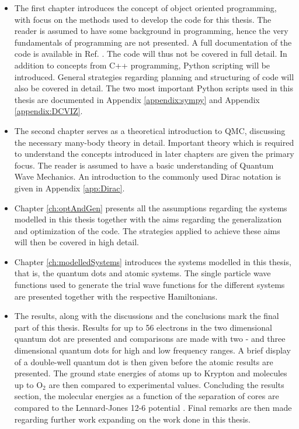 \begin{itemize}
 \item The first chapter introduces the concept of object oriented programming, with focus on the methods used to develop the code for this thesis. The reader is assumed to have some background in programming, hence the very fundamentals of programming are not presented. A full documentation of the code is available in Ref. \cite{libBorealisCode}. The code will thus not be covered in full detail. In addition to concepts from C++ programming, Python scripting will be introduced. General strategies regarding planning and structuring of code will also be covered in detail. The two most important Python scripts used in this thesis are documented in Appendix \ref{appendix:sympy} and Appendix \ref{appendix:DCVIZ}.
 
 \item The second chapter serves as a theoretical introduction to QMC, discussing the necessary many-body theory in detail. Important theory which is required to understand the concepts introduced in later chapters are given the primary focus. The reader is assumed to have a basic understanding of Quantum Wave Mechanics. An introduction to the commonly used Dirac notation is given in Appendix \ref{app:Dirac}.
 
 \item Chapter \ref{ch:optAndGen} presents all the assumptions regarding the systems modelled in this thesis together with the aims regarding the generalization and optimization of the code. The strategies applied to achieve these aims will then be covered in high detail.
 
 \item Chapter \ref{ch:modelledSystems} introduces the systems modelled in this thesis, that is, the quantum dots and atomic systems. The single particle wave functions used to generate the trial wave functions for the different systems are presented together with the respective Hamiltonians.
 
 \item The results, along with the discussions and the conclusions mark the final part of this thesis. Results for up to 56 electrons in the two dimensional quantum dot are presented and comparisons are made with two - and three dimensional quantum dots for high and low frequency ranges. A brief display of a double-well quantum dot is then given before the atomic results are presented. The ground state energies of atoms up to Krypton and molecules up to $\mathrm{O_2}$ are then compared to experimental values. Concluding the results section, the molecular energies as a function of the separation of cores are compared to the Lennard-Jones 12-6 potential \cite{MD1, MD2}. Final remarks are then made regarding further work expanding on the work done in this thesis. 
\end{itemize}